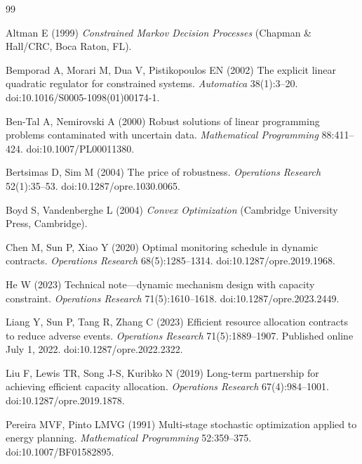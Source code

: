 \begin{thebibliography}{99}\raggedright
{}
Altman E (1999) \emph{Constrained Markov Decision Processes} (Chapman \& Hall/CRC, Boca Raton, FL).

Bemporad A, Morari M, Dua V, Pistikopoulos EN (2002) The explicit linear quadratic regulator for constrained systems. \emph{Automatica} 38(1):3--20. doi:10.1016/S0005-1098(01)00174-1.

Ben-Tal A, Nemirovski A (2000) Robust solutions of linear programming problems contaminated with uncertain data. \emph{Mathematical Programming} 88:411--424. doi:10.1007/PL00011380.

Bertsimas D, Sim M (2004) The price of robustness. \emph{Operations Research} 52(1):35--53. doi:10.1287/opre.1030.0065.

Boyd S, Vandenberghe L (2004) \emph{Convex Optimization} (Cambridge University Press, Cambridge).

Chen M, Sun P, Xiao Y (2020) Optimal monitoring schedule in dynamic contracts. \emph{Operations Research} 68(5):1285--1314. doi:10.1287/opre.2019.1968.

He W (2023) Technical note---dynamic mechanism design with capacity constraint. \emph{Operations Research} 71(5):1610--1618. doi:10.1287/opre.2023.2449.

Liang Y, Sun P, Tang R, Zhang C (2023) Efficient resource allocation contracts to reduce adverse events. \emph{Operations Research} 71(5):1889--1907. Published online July 1, 2022. doi:10.1287/opre.2022.2322.

Liu F, Lewis TR, Song J-S, Kuribko N (2019) Long-term partnership for achieving efficient capacity allocation. \emph{Operations Research} 67(4):984--1001. doi:10.1287/opre.2019.1878.

Pereira MVF, Pinto LMVG (1991) Multi-stage stochastic optimization applied to energy planning. \emph{Mathematical Programming} 52:359--375. doi:10.1007/BF01582895.


\end{thebibliography}
